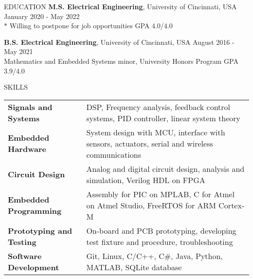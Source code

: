 \documentclass{../lib/resume} %
\begin{document}

    \begin{rSection}{EDUCATION}
        {\bf M.S. Electrical Engineering}, University of Cincinnati, USA \hfill {January 2020 - May 2022} \\
        $*$ Willing to postpone for job opportunities \hfill GPA 4.0/4.0 \smallskip

        {\bf B.S. Electrical Engineering}, University of Cincinnati, USA \hfill {August 2016 - May 2021}\\
        Mathematics and Embedded Systems minor, University Honors Program \hfill {GPA 3.9/4.0}




    \end{rSection}

    \begin{rSection}{SKILLS}

        \begin{tabular}{ @{} >{\bfseries}l @{\hspace{2ex}} l }
            Signals and Systems & DSP, Frequency analysis, feedback control systems, PID controller, linear system theory	\\
            Embedded Hardware & System design with MCU, interface with sensors, actuators, serial and wireless communications \\
            Circuit Design & Analog and digital circuit design, analysis and simulation, Verilog HDL on FPGA \\
            Embedded Programming & Assembly for PIC on MPLAB, C for Atmel on Atmel Studio, FreeRTOS for ARM Cortex-M \\
            Prototyping and Testing &  On-board and PCB prototyping, developing test fixture and procedure, troubleshooting	\\
            Software Development & Git, Linux, C/C++, C\#, Java, Python, MATLAB, SQLite database \\
        \end{tabular}
    \end{rSection}
\end{document}
